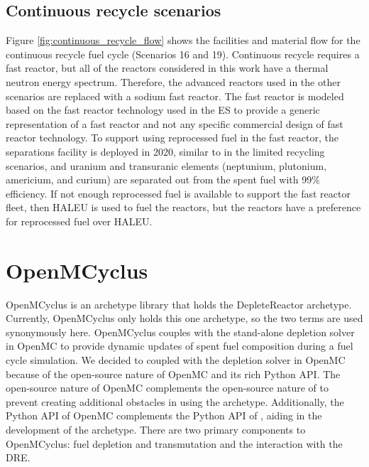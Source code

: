 \subsection{Continuous recycle scenarios}
Figure \ref{fig:continuous_recycle_flow} shows the facilities and material 
flow for the continuous recycle fuel cycle (Scenarios 16 and 19). Continuous recycle 
requires a fast reactor, but all of the reactors considered in this 
work have a thermal neutron energy spectrum. Therefore, the advanced 
reactors used in the other scenarios are replaced with a sodium fast 
reactor. The fast reactor is modeled 
based on the fast reactor technology used in the \gls{ES} 
\cite{wigeland_nuclear_2014} to provide a generic representation of 
a fast reactor and not any specific commercial design of fast reactor 
technology. To support using reprocessed fuel in the fast reactor, 
the separations facility is deployed in 2020, similar to in the 
limited recycling scenarios, and uranium and transuranic elements 
(neptunium, plutonium, americium, and curium) are separated out from 
the spent fuel with 99\% efficiency. If not enough reprocessed fuel is 
available to support the fast reactor fleet, then \gls{HALEU} is used 
to fuel the reactors, but the reactors have a preference for reprocessed 
fuel over \gls{HALEU}. 



\section{OpenMCyclus}\label{sec:openmcyclus}
OpenMCyclus is an archetype library that holds the DepleteReactor 
archetype. Currently, OpenMCyclus only holds this one archetype, so 
the two terms are used synonymously here. OpenMCyclus couples 
\Cyclus with the stand-alone depletion solver in OpenMC to provide 
dynamic updates of spent fuel composition during a fuel cycle simulation.
We decided to coupled with the depletion solver in OpenMC because 
of the open-source nature of OpenMC and its rich Python \gls{API}. 
The open-source nature of OpenMC complements the open-source nature 
of \Cyclus to prevent creating additional obstacles in using the archetype. 
Additionally, the Python \gls{API} of OpenMC complements the Python 
\gls{API} of \Cyclus, aiding in the development of the archetype. 
There are two primary components to OpenMCyclus: fuel depletion and 
transmutation and the interaction with the \Cyclus \gls{DRE}. 

